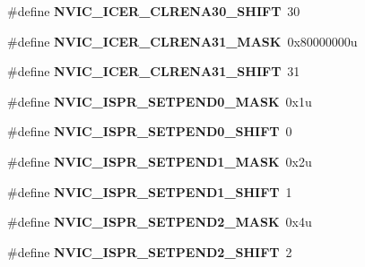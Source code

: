 \begin{DoxyCompactItemize}
\#define {\bfseries N\+V\+I\+C\+\_\+\+I\+C\+E\+R\+\_\+\+C\+L\+R\+E\+N\+A30\+\_\+\+S\+H\+I\+FT}~30
\item 
\mbox{\label{group___n_v_i_c___register___masks_ga0907bd00967fca851b2736f05b54df63}} 
\#define {\bfseries N\+V\+I\+C\+\_\+\+I\+C\+E\+R\+\_\+\+C\+L\+R\+E\+N\+A31\+\_\+\+M\+A\+SK}~0x80000000u
\item 
\mbox{\label{group___n_v_i_c___register___masks_gaede68be735405ed86a3a262c702b8e59}} 
\#define {\bfseries N\+V\+I\+C\+\_\+\+I\+C\+E\+R\+\_\+\+C\+L\+R\+E\+N\+A31\+\_\+\+S\+H\+I\+FT}~31
\item 
\mbox{\label{group___n_v_i_c___register___masks_ga7a98580a454c3027a1ecfd7bf2ff3655}} 
\#define {\bfseries N\+V\+I\+C\+\_\+\+I\+S\+P\+R\+\_\+\+S\+E\+T\+P\+E\+N\+D0\+\_\+\+M\+A\+SK}~0x1u
\item 
\mbox{\label{group___n_v_i_c___register___masks_gaa757bd63f310c2451471ec3dcd886a8a}} 
\#define {\bfseries N\+V\+I\+C\+\_\+\+I\+S\+P\+R\+\_\+\+S\+E\+T\+P\+E\+N\+D0\+\_\+\+S\+H\+I\+FT}~0
\item 
\mbox{\label{group___n_v_i_c___register___masks_ga5808e6053ab3ece6f30901d616019c71}} 
\#define {\bfseries N\+V\+I\+C\+\_\+\+I\+S\+P\+R\+\_\+\+S\+E\+T\+P\+E\+N\+D1\+\_\+\+M\+A\+SK}~0x2u
\item 
\mbox{\label{group___n_v_i_c___register___masks_ga07924e4e3ad828e3e3bc441910245c7a}} 
\#define {\bfseries N\+V\+I\+C\+\_\+\+I\+S\+P\+R\+\_\+\+S\+E\+T\+P\+E\+N\+D1\+\_\+\+S\+H\+I\+FT}~1
\item 
\mbox{\label{group___n_v_i_c___register___masks_gaef9f99ad6dacb96dc998b3853bb03816}} 
\#define {\bfseries N\+V\+I\+C\+\_\+\+I\+S\+P\+R\+\_\+\+S\+E\+T\+P\+E\+N\+D2\+\_\+\+M\+A\+SK}~0x4u
\item 
\mbox{\label{group___n_v_i_c___register___masks_ga3bdfd2411abf6ca642fbe98c9f6a6530}} 
\#define {\bfseries N\+V\+I\+C\+\_\+\+I\+S\+P\+R\+\_\+\+S\+E\+T\+P\+E\+N\+D2\+\_\+\+S\+H\+I\+FT}~2

\end{DoxyCompactItemize}
